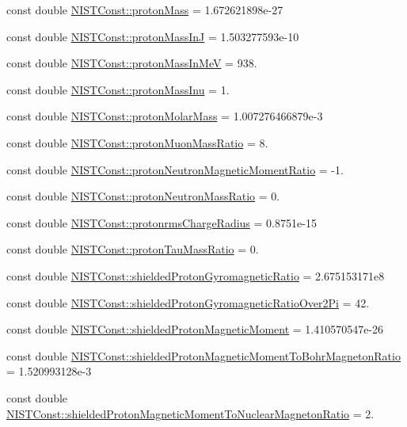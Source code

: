\begin{DoxyCompactItemize}
\item 
const double \hyperlink{group___proton_gaa6738785a6bf04323231318dd6b2ed90}{N\+I\+S\+T\+Const\+::proton\+Mass} = 1.\+672621898e-\/27
\item 
const double \hyperlink{group___proton_ga72cd86bc08ccb88687e8670d9efb378a}{N\+I\+S\+T\+Const\+::proton\+Mass\+InJ} = 1.\+503277593e-\/10
\item 
const double \hyperlink{group___proton_ga06647c44742d27b1ad81a9bec98298c1}{N\+I\+S\+T\+Const\+::proton\+Mass\+In\+MeV} = 938.
\item 
const double \hyperlink{group___proton_gaf2a9916164fce50112bd8bbe8b712e5a}{N\+I\+S\+T\+Const\+::proton\+Mass\+Inu} = 1.
\item 
const double \hyperlink{group___proton_ga8a29760b90301104dbd9512674eccc4c}{N\+I\+S\+T\+Const\+::proton\+Molar\+Mass} = 1.\+007276466879e-\/3
\item 
const double \hyperlink{group___proton_gab9c5458c70434c20a8527661c4ff0b73}{N\+I\+S\+T\+Const\+::proton\+Muon\+Mass\+Ratio} = 8.
\item 
const double \hyperlink{group___proton_ga349fed5e91e8d7f8d71ba45405da64e7}{N\+I\+S\+T\+Const\+::proton\+Neutron\+Magnetic\+Moment\+Ratio} = -\/1.
\item 
const double \hyperlink{group___proton_ga8b54a81cc7dec7f196f874dcc81dbab2}{N\+I\+S\+T\+Const\+::proton\+Neutron\+Mass\+Ratio} = 0.
\item 
const double \hyperlink{group___proton_gadc726e50679ce96f2d6c0e84c378998e}{N\+I\+S\+T\+Const\+::protonrms\+Charge\+Radius} = 0.\+8751e-\/15
\item 
const double \hyperlink{group___proton_ga6b8624fb113601433f311bb5d3423115}{N\+I\+S\+T\+Const\+::proton\+Tau\+Mass\+Ratio} = 0.
\item 
const double \hyperlink{group___proton_ga2affce442da8b445cce1c580b41bbd82}{N\+I\+S\+T\+Const\+::shielded\+Proton\+Gyromagnetic\+Ratio} = 2.\+675153171e8
\item 
const double \hyperlink{group___proton_ga5b2d223ede8fc141af04cef0486c2c52}{N\+I\+S\+T\+Const\+::shielded\+Proton\+Gyromagnetic\+Ratio\+Over2\+Pi} = 42.
\item 
const double \hyperlink{group___proton_ga3e2c09881642d47d3e869c7803862e6f}{N\+I\+S\+T\+Const\+::shielded\+Proton\+Magnetic\+Moment} = 1.\+410570547e-\/26
\item 
const double \hyperlink{group___proton_ga175eb518370bc31471e8ad763e760b72}{N\+I\+S\+T\+Const\+::shielded\+Proton\+Magnetic\+Moment\+To\+Bohr\+Magneton\+Ratio} = 1.\+520993128e-\/3
\item 
const double \hyperlink{group___proton_ga03e84ef0d1452fa7c647f8866913fbc3}{N\+I\+S\+T\+Const\+::shielded\+Proton\+Magnetic\+Moment\+To\+Nuclear\+Magneton\+Ratio} = 2.
\end{DoxyCompactItemize}


